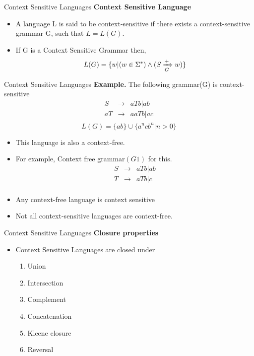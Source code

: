 \documentclass{beamer}
\begin{document}
\begin{frame}{Context Sensitive Languages}
	\textbf{Context Sensitive Language}
	\begin{itemize}
		\item A language L is said to be context-sensitive if there exists a
		context-sensitive grammar G, such that $L = L(G).$
		\item If G is a Context Sensitive Grammar then,
		$$L(G) = \{w|(w \in \Sigma^*) \land (S\xRightarrow[G]{+}w)\}$$
		\end{itemize}
\end{frame}
\begin{frame}{Context Sensitive Languages}
	\textbf{Example.} The following grammar(G) is context-sensitive
	\begin{eqnarray*}
		S &\rightarrow& aTb|ab \\
		aT &\rightarrow& aaTb|ac \\
	\end{eqnarray*}
$$L(G) = \{ab\} \cup \{a^ncb^n |n > 0\}
$$
\begin{itemize}
	\item This language is also a context-free.
	\item For example, Context free grammar$(G1)$ for this.
	\begin{eqnarray*}
		S &\rightarrow& aTb|ab \\
		T &\rightarrow& aTb|c \\
	\end{eqnarray*}
\item Any context-free language is context sensitive
\item Not all context-sensitive languages are context-free.
\end{itemize}
\end{frame}
\begin{frame}{Context Sensitive Languages}
	\textbf{Closure properties}
	\begin{itemize}
		\item Context Sensitive Languages are closed under
		\begin{enumerate}
			\item Union
			\item	Intersection
			\item	Complement
			\item	Concatenation
			\item	Kleene closure
			\item	Reversal
		\end{enumerate}
	\end{itemize}

\end{frame}
\end{document}
